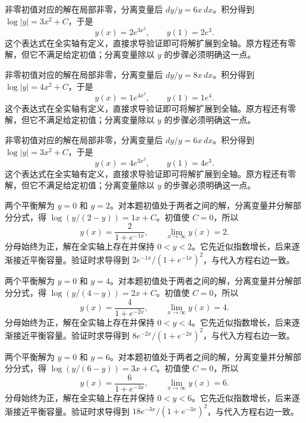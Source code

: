 \documentclass[UTF8,12pt,a4paper,fontset=fandol]{ctexart}
\begin{document}
\begin{solve}\label{ans:c23q4}
非零初值对应的解在局部非零，分离变量后 $dy/y=6x\,dx$。积分得到 $\log|y|=3x^2+C$，于是
\[
y(x)=2e^{3x^2},\qquad y(1)=2e^{3}.
\]
这个表达式在全实轴有定义，直接求导验证即可将解扩展到全轴。原方程还有零解，但它不满足给定初值；分离变量除以 $y$ 的步骤必须明确这一点。
\end{solve}

\begin{solve}\label{ans:c23q5}
非零初值对应的解在局部非零，分离变量后 $dy/y=8x\,dx$。积分得到 $\log|y|=4x^2+C$，于是
\[
y(x)=1e^{4x^2},\qquad y(1)=1e^{4}.
\]
这个表达式在全实轴有定义，直接求导验证即可将解扩展到全轴。原方程还有零解，但它不满足给定初值；分离变量除以 $y$ 的步骤必须明确这一点。
\end{solve}

\begin{solve}\label{ans:c23q6}
非零初值对应的解在局部非零，分离变量后 $dy/y=6x\,dx$。积分得到 $\log|y|=3x^2+C$，于是
\[
y(x)=4e^{3x^2},\qquad y(1)=4e^{3}.
\]
这个表达式在全实轴有定义，直接求导验证即可将解扩展到全轴。原方程还有零解，但它不满足给定初值；分离变量除以 $y$ 的步骤必须明确这一点。
\end{solve}

\begin{solve}\label{ans:c23q7}
两个平衡解为 $y=0$ 和 $y=2$。对本题初值处于两者之间的解，分离变量并分解部分分式，得 $\log(y/(2-y))=1x+C$。初值使 $C=0$，所以
\[
y(x)=\frac{2}{1+e^{-1x}},\qquad\lim_{x\to\infty}y(x)=2.
\]
分母始终为正，解在全实轴上存在并保持 $0<y<2$。它先近似指数增长，后来逐渐接近平衡容量。验证时求导得到 $2e^{-1x}/(1+e^{-1x})^2$，与代入方程右边一致。
\end{solve}

\begin{solve}\label{ans:c23q8}
两个平衡解为 $y=0$ 和 $y=4$。对本题初值处于两者之间的解，分离变量并分解部分分式，得 $\log(y/(4-y))=2x+C$。初值使 $C=0$，所以
\[
y(x)=\frac{4}{1+e^{-2x}},\qquad\lim_{x\to\infty}y(x)=4.
\]
分母始终为正，解在全实轴上存在并保持 $0<y<4$。它先近似指数增长，后来逐渐接近平衡容量。验证时求导得到 $8e^{-2x}/(1+e^{-2x})^2$，与代入方程右边一致。
\end{solve}

\begin{solve}\label{ans:c23q9}
两个平衡解为 $y=0$ 和 $y=6$。对本题初值处于两者之间的解，分离变量并分解部分分式，得 $\log(y/(6-y))=3x+C$。初值使 $C=0$，所以
\[
y(x)=\frac{6}{1+e^{-3x}},\qquad\lim_{x\to\infty}y(x)=6.
\]
分母始终为正，解在全实轴上存在并保持 $0<y<6$。它先近似指数增长，后来逐渐接近平衡容量。验证时求导得到 $18e^{-3x}/(1+e^{-3x})^2$，与代入方程右边一致。
\end{solve}
\end{document}

